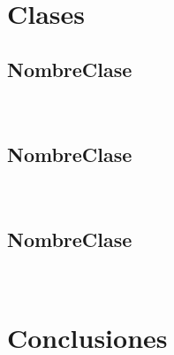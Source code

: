 \begin{lstlisting}[language=Java, caption=NombreClase]
 
\end{lstlisting}


\section{Clases}

\subsection{NombreClase}

\begin{lstlisting}[language=Java, caption=NombreClase]
 
\end{lstlisting}


\subsection{NombreClase}

\begin{lstlisting}[language=Java, caption=NombreClase]
 
\end{lstlisting}


\subsection{NombreClase}

\begin{lstlisting}[language=Java, caption=NombreClase]
 
\end{lstlisting}


\section{Conclusiones}

